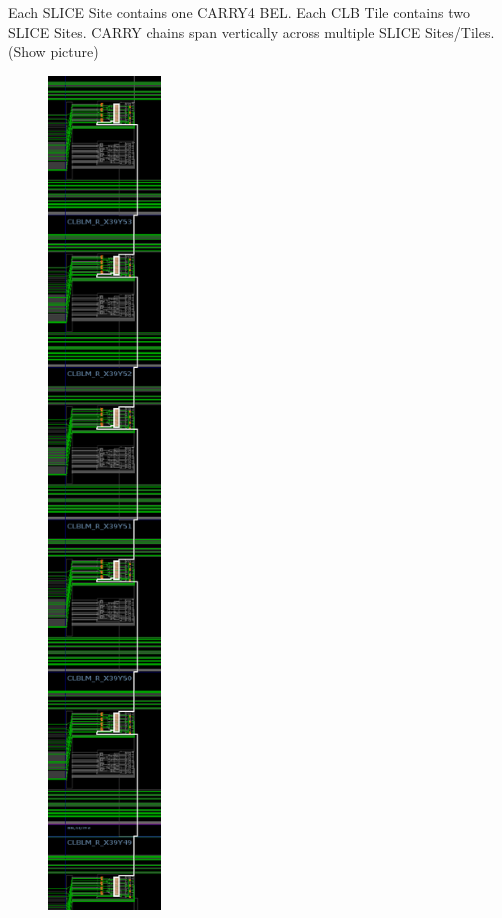 \documentclass[twocolumn]{article}
\begin{document}
            Each SLICE Site contains one CARRY4 BEL. 
            Each CLB Tile contains two SLICE Sites. 
            CARRY chains span vertically across multiple SLICE Sites/Tiles. (Show picture) 
            \begin{figure}
                \centering
                \includegraphics[width=3.0cm]{figures/carry_chain_routes.png}

\end{figure}
\end{document}
